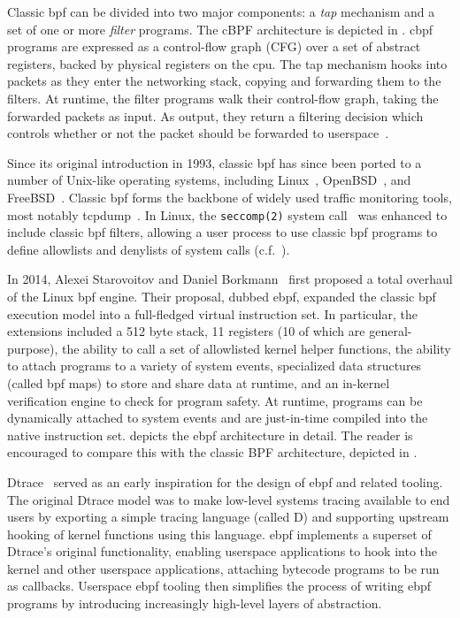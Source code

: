 \documentclass[
  fontsize=12pt,
  titlepage=firstiscover,
  paper=letter,
oneside,
  cleardoublepage=plain,
  parskip=half-,
  DIV=10,
  parindent,
  appendixprefix,
  chapterprefix,
  listof=totoc,
]{scrbook}
\begin{document}
Classic \gls{bpf} can be divided into two major components: a \textit{tap} mechanism and a set
of one or more \textit{filter} programs. The cBPF architecture is depicted in
. \gls{cbpf} programs are expressed as a control-flow graph (CFG)
over a set of abstract registers, backed by physical registers on the \gls{cpu}. The tap
mechanism hooks into packets as they enter the networking stack, copying and forwarding
them to the filters. At runtime, the filter programs walk their control-flow graph, taking
the forwarded packets as input. As output, they return a filtering decision which controls
whether or not the packet should be forwarded to userspace~\cite{mccanne1993_bpf}.

Since its original introduction in 1993, classic \gls{bpf} has since been ported to
a number of Unix-like operating systems, including Linux~\cite{linux_bpf},
OpenBSD~\cite{openbsd_bpf}, and FreeBSD~\cite{freebsd_bpf}. Classic \gls{bpf} forms the
backbone of widely used traffic monitoring tools, most notably tcpdump~\cite{tcpdump,
mccanne1993_bpf}. In Linux, the \texttt{seccomp(2)} system
call~\cite{anderson2017_comparison} was enhanced to include classic \gls{bpf} filters,
allowing a user process to use classic \gls{bpf} programs to define allowlists and
denylists of system calls (c.f.\ ).

In 2014, Alexei Starovoitov and Daniel Borkmann~\cite{starovoitov2014_ebpf} first proposed
a total overhaul of the Linux \gls{bpf} engine. Their proposal, dubbed \gls{ebpf}, expanded the
classic \gls{bpf} execution model into a full-fledged virtual instruction set. In particular,
the extensions included a 512 byte stack, 11 registers (10 of which are general-purpose),
the ability to call a set of allowlisted kernel helper functions, the ability to attach
programs to a variety of system events, specialized data structures (called \gls{bpf} maps) to
store and share data at runtime, and an in-kernel verification engine to check for program
safety. At runtime, programs can be dynamically attached to system events and are
just-in-time compiled into the native instruction set.   depicts
the \gls{ebpf} architecture in detail. The reader is encouraged to compare this with the classic
BPF architecture, depicted in .

Dtrace~\cite{cantrill2004_dtrace, gregg2001_dtrace} served as an early inspiration for the
design of \gls{ebpf} and related tooling. The original Dtrace model was to make low-level
systems tracing available to end users by exporting a simple tracing language (called D)
and supporting upstream hooking of kernel functions using this language. \gls{ebpf}
implements a superset of Dtrace's original functionality, enabling userspace applications
to hook into the kernel and other userspace applications, attaching bytecode programs to
be run as callbacks.  Userspace \gls{ebpf} tooling then simplifies the process of writing
\gls{ebpf} programs by introducing increasingly high-level layers of abstraction.
\end{document}
